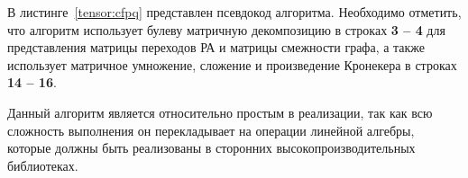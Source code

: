 




В листинге~\ref{tensor:cfpq} представлен псевдокод алгоритма. Необходимо отметить, что алгоритм использует булеву матричную декомпозицию в строках \textbf{3 -- 4} для представления матрицы переходов РА и матрицы смежности графа, а также использует матричное умножение, сложение и произведение Кронекера в строках \textbf{14 -- 16}.

Данный алгоритм является относительно простым в реализации, так как всю сложность выполнения он перекладывает на операции линейной алгебры, которые должны быть реализованы в сторонних высокопроизводительных библиотеках.

